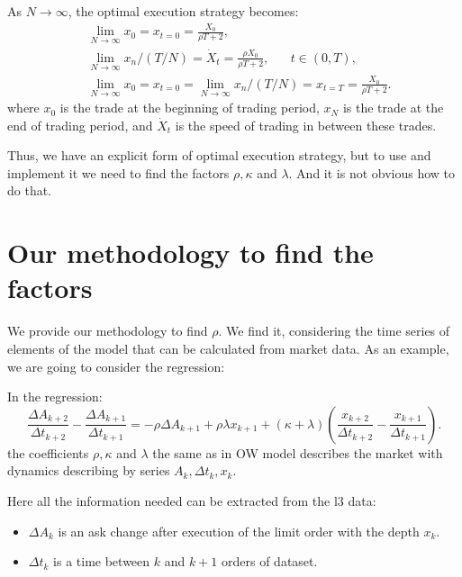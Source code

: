 \begin{theorem}
    As $N \rightarrow \infty$, the optimal execution strategy becomes:
    \begin{align*}
        & \lim _{N \rightarrow \infty} x_0 = x_{t = 0} = \frac{X_0}{\rho T + 2}, \\
        & \lim _{N \rightarrow \infty} x_n / (T/N) = \dot X _t = \frac{\rho X_0}{\rho T + 2}, \;\;\;\;\;\; t \in (0, T), \\
        & \lim _{N \rightarrow \infty} x_0 = x_{t = 0} = \lim _{N \rightarrow \infty} x_n / (T/N) = x_{t=T}=  \frac{X_0}{\rho T + 2}.  %
    \end{align*}
    where $x_0$ is the trade at the beginning of trading period, $x_N$ is the trade at the end of trading
    period, and $\dot X _t$ is the speed of trading in between these trades.
\end{theorem}

Thus, we have an explicit form of optimal execution strategy, but to use and implement it we need to find the factors 
$\rho, \kappa$ and $\lambda$. And it is not obvious how to do that.


\section{Our methodology to find the factors}

We provide our methodology to find $\rho$. We find it, considering the time series of elements of the model 
that can be calculated from market data. As an example, we are going to consider the regression:
\begin{theorem}
        In the regression:                                                                                                                                                                                                                                                                                                                                                                                        
        \begin{equation*}
            \frac{\Delta A_{k+2}}{\Delta t_{k+2}} - \frac{\Delta A_{k+1}}{\Delta t_{k+1}} 
        = - \rho \Delta A_{k+1} + \rho \lambda x_{k+1} + (\kappa + \lambda) (\frac{x_{k+2}}{\Delta t_{k+2}} - \frac{x_{k+1}}{\Delta t_{k+1}}).
        \end{equation*}
        the coefficients $\rho, \kappa$ and $\lambda$ the same as in OW model describes the market with dynamics
        describing by series $A_k, \Delta t _k, x_k$.
\end{theorem}

        Here all the information needed can be extracted from the l3 data: 
        \begin{itemize}
            \item $\Delta A_{k}$ is an ask change after execution of the limit order with the depth $x_k$.
            \item $\Delta t_{k}$ is a time between $k$ and $k + 1$ orders of dataset.
        \end{itemize}